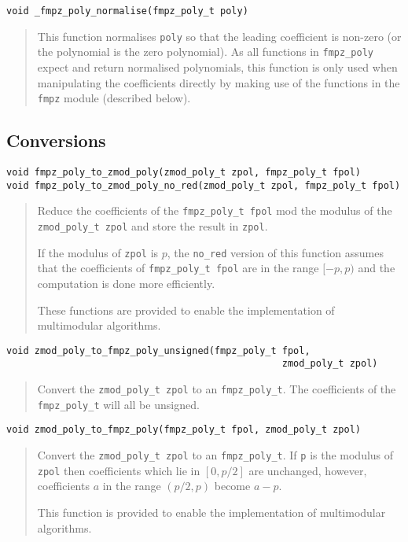 \documentclass[a4paper,10pt]{article}
\newcommand{\code}{\lstinline}
\begin{document}
\begin{lstlisting}
void _fmpz_poly_normalise(fmpz_poly_t poly) 
\end{lstlisting}
\begin{quote}
This function normalises \code{poly} so that the leading coefficient is non-zero (or the polynomial is the zero polynomial). As all functions in \code{fmpz_poly} expect and return normalised polynomials, this function is only used when manipulating the coefficients directly by making use of the functions in the \code{fmpz} module (described below).
\end{quote}

\subsection{Conversions}

\begin{lstlisting}
void fmpz_poly_to_zmod_poly(zmod_poly_t zpol, fmpz_poly_t fpol)
void fmpz_poly_to_zmod_poly_no_red(zmod_poly_t zpol, fmpz_poly_t fpol)
\end{lstlisting}
\begin{quote}
Reduce the coefficients of the \code{fmpz_poly_t fpol} mod the modulus of the \code{zmod_poly_t zpol} and store the result in \code{zpol}.

If the modulus of \code{zpol} is $p$, the \code{no_red} version of this function assumes that the coefficients of \code{fmpz_poly_t fpol} are in the range $[-p, p)$ and the computation is done more efficiently.

These functions are provided to enable the implementation of multimodular algorithms.
\end{quote}

\begin{lstlisting}
void zmod_poly_to_fmpz_poly_unsigned(fmpz_poly_t fpol, 
                                                 zmod_poly_t zpol)
\end{lstlisting}
\begin{quote}
Convert the \code{zmod_poly_t zpol} to an \code{fmpz_poly_t}. The coefficients of the \code{fmpz_poly_t} will all be unsigned.
\end{quote}

\begin{lstlisting}
void zmod_poly_to_fmpz_poly(fmpz_poly_t fpol, zmod_poly_t zpol)
\end{lstlisting}
\begin{quote}
Convert the \code{zmod_poly_t zpol} to an \code{fmpz_poly_t}. If \code{p} is the modulus of \code{zpol} then coefficients which lie in $[0, p/2]$ are unchanged, however, coefficients $a$ in the range $(p/2, p)$ become $a - p$.

This function is provided to enable the implementation of multimodular algorithms.
\end{quote}
\end{document}
